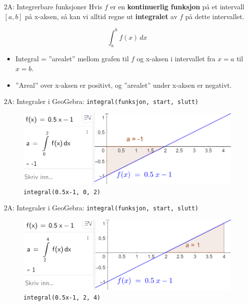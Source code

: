 \redheader
\begin{frame}{2A: Integrerbare funksjoner}
Hvis $f$ er en \textbf{kontinuerlig funksjon} på et intervall $[a,b]$ på x-aksen,  
så kan vi alltid regne ut \textbf{integralet} av $f$ på dette intervallet.  

\medskip

\[
    \int_a^b f(x)\,dx
\]

\medskip
\begin{itemize}
    \item Integral = ''arealet'' mellom grafen til $f$  
          og x-aksen i intervallet fra $x=a$ til $x=b$.
    \item ''Areal'' over x-aksen er positivt, og ''arealet'' under x-aksen er negativt.
\end{itemize}
\end{frame}

\blueheader
\begin{frame}[fragile]{2A: Integraler i GeoGebra: \texttt{integral(funksjon, start, slutt)}}
\begin{figure}
    \centering
    \includegraphics[width=\linewidth]{R2-K2A-9.png}
    \caption{\texttt{integral(0.5x-1, 0, 2)}}
\end{figure}
\end{frame}

\blueheader
\begin{frame}[fragile]{2A: Integraler i GeoGebra: \texttt{integral(funksjon, start, slutt)}}
\begin{figure}
    \centering
    \includegraphics[width=\linewidth]{R2-K2A-10.png}
    \caption{\texttt{integral(0.5x-1, 2, 4)}}
\end{figure}
\end{frame}

